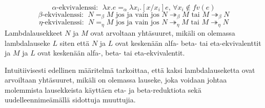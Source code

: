 \begin{maar}
		 
\[ 
	\alpha \text{-ekvivalenssi: } \; \lambda x.e =_{\alpha} \lambda x_{i}.		[x/x_{i}]e \text{,  } \forall x_{i} \notin fv(e) 
\]
\[ 
	\beta \text{-ekvivalenssi: } \; N =_{\beta} M \text{ jos ja vain jos } N 		\twoheadrightarrow_{\beta} M \text{ tai }
	M \twoheadrightarrow_{\beta} N 
\]
\[ 
	\eta \text{-ekvivalenssi: } \; N =_{\eta} M \text{ jos ja vain jos } N 		\twoheadrightarrow_{\eta} M \text{ tai }
	M \twoheadrightarrow_{\eta} N 
\]
Lambdalausekkeet $N$ ja $M$ ovat arvoltaan yhtäsuuret, mikäli	on olemassa lambdalauseke $L$ siten että $N$ ja $L$ ovat keskenään alfa- beta- tai eta-ekvivalenttit ja $M$ ja $L$ ovat keskenään alfa-, beta- tai eta-ekvivalentit.	
\end{maar}

Intuitiivisesti edellinen määritelmä tarkoittaa, että kaksi lambdalauseketta ovat arvoiltaan yhtäsuuret, mikäli on olemassa lauseke, joka voidaan johtaa molemmista lausekkeista käyttäen eta- ja beta-reduktiota sekä uudelleennimeämällä sidottuja muuttujia. 


 
